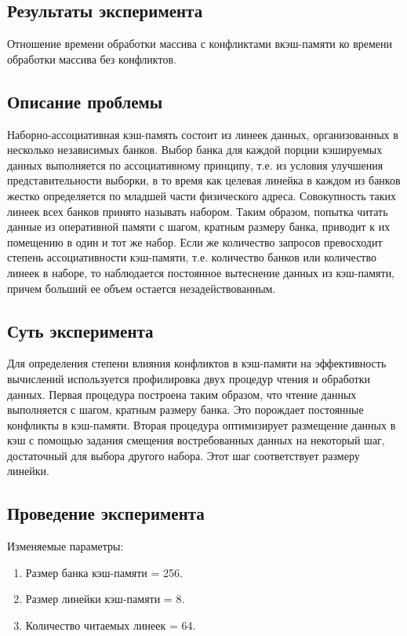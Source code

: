 \subsection{Результаты эксперимента}
Отношение времени обработки массива с конфликтами вкэш-памяти ко времени
обработки массива без конфликтов.

\subsection{Описание проблемы}
Наборно-ассоциативная кэш-память состоит из линеек данных, организованных в
несколько независимых банков. Выбор банка для каждой порции кэшируемых данных
выполняется по ассоциативному принципу, т.е. из условия улучшения
представительности выборки, в то время как целевая линейка в каждом из банков
жестко определяется по младшей части физического адреса. Совокупность таких
линеек всех банков принято называть набором. Таким образом, попытка читать
данные из оперативной памяти с шагом, кратным размеру банка, приводит к их
помещению в один и тот же набор. Если же количество запросов превосходит степень
ассоциативности кэш-памяти, т.е. количество банков или количество линеек в
наборе, то наблюдается постоянное вытеснение данных из кэш-памяти, причем
больший ее объем  остается незадействованным.

\subsection{Суть эксперимента}  
Для определения степени влияния конфликтов в кэш-памяти на эффективность
вычислений используется профилировка двух процедур чтения и обработки данных.
Первая процедура построена таким образом, что чтение данных выполняется с
шагом, кратным размеру банка. Это порождает постоянные конфликты в
кэш-памяти. Вторая процедура оптимизирует размещение данных в кэш с помощью
задания смещения востребованных данных на некоторый шаг, достаточный для выбора
другого набора. Этот шаг соответствует размеру линейки.  

\subsection{Проведение эксперимента}

Изменяемые параметры:
\begin{enumerate}
	\item Размер банка кэш-памяти = 256.
	\item Размер линейки кэш-памяти = 8.
	\item Количество читаемых линеек = 64.
\end{enumerate}

